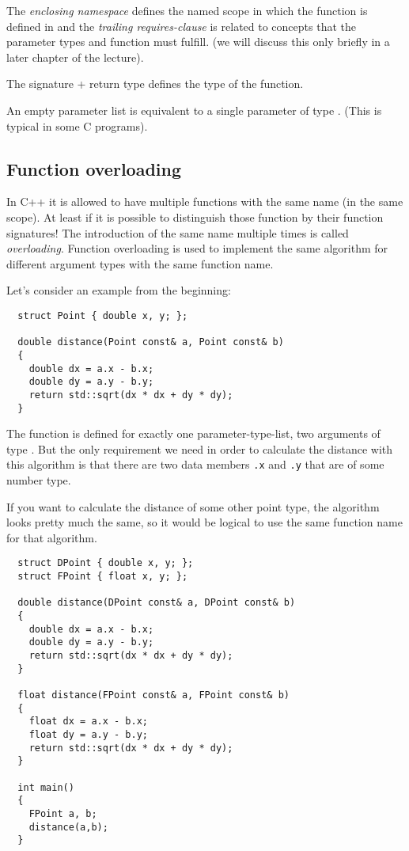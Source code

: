 The \emph{enclosing namespace} defines the named scope in which the function is defined in and the \emph{trailing requires-clause} is related
to concepts that the parameter types and function must fulfill. (we will discuss this only briefly in a later chapter of the lecture).

The signature + return type defines the type of the function.

\begin{rem}
  An empty parameter list is equivalent to a single parameter of type . (This is typical in some C programs).
\end{rem}


\subsection{Function overloading\label{sec:function-overloading}}
In C++ it is allowed to have multiple functions with the same name (in the same scope). At least if it is possible to distinguish those function by
their function signatures! The introduction of the same name multiple times is called \emph{overloading}. Function overloading is used to implement
the same algorithm for different argument types with the same function name.

\begin{example}
Let's consider an example from the beginning:
%
\begin{verbatim}
  struct Point { double x, y; };

  double distance(Point const& a, Point const& b)
  {
    double dx = a.x - b.x;
    double dy = a.y - b.y;
    return std::sqrt(dx * dx + dy * dy);
  }
\end{verbatim}
%
The function  is defined for exactly one parameter-type-list, \ie two arguments of type . But the only requirement we need
in order to calculate the distance with this algorithm is that there are two data members \texttt{.x} and \texttt{.y} that are of some number type.

If you want to calculate the distance of some other point type, the algorithm looks pretty much the same, so it would be logical to use the same function
name for that algorithm.
%
\begin{verbatim}
  struct DPoint { double x, y; };
  struct FPoint { float x, y; };

  double distance(DPoint const& a, DPoint const& b)
  {
    double dx = a.x - b.x;
    double dy = a.y - b.y;
    return std::sqrt(dx * dx + dy * dy);
  }

  float distance(FPoint const& a, FPoint const& b)
  {
    float dx = a.x - b.x;
    float dy = a.y - b.y;
    return std::sqrt(dx * dx + dy * dy);
  }

  int main()
  {
    FPoint a, b;
    distance(a,b);
  }
\end{verbatim}
\end{example}

